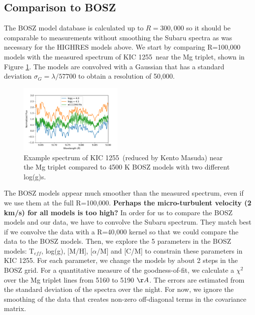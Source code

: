 \documentclass[twocolumn]{aastex61}
\newcommand{\shStar}{KIC 1255}
\begin{document}
\subsection{Comparison to BOSZ}
The BOSZ  \citep{bohlin2017bosz} model database is calculated up to $R = 300,000$ so it should be comparable to measurements without smoothing the Subaru spectra as was necessary for the HIGHRES models above.
We start by comparing R=100,000 models with the measured spectrum of \shStar\ near the Mg triplet, shown in Figure \ref{fig:mgTripletBOSZ}.
The models are convolved with a Gaussian that has a standard deviation $\sigma_G = \lambda/57700$  to obtain a resolution of 50,000.


\begin{figure}[!hbtp]
\begin{centering}
\includegraphics[width=0.45\textwidth]{images/subaru/bosz_mg_triplet.pdf}
\caption{Example spectrum of \shStar\ (reduced by Kento Masuda) near the Mg triplet compared to 4500 K BOSZ models with two different log(g)s.}\label{fig:mgTripletBOSZ}
\end{centering}
\end{figure}

The BOSZ models appear much smoother than the measured spectrum, even if we use them at the full R=100,000.
\textbf{Perhaps the micro-turbulent velocity (2 km/s) for all models is too high?}
In order for us to compare the BOSZ models and our data, we have to convolve the Subaru spectrum.
They match best if we convolve the data with a R=40,000 kernel so that we could compare the data to the BOSZ models.
Then, we explore the 5 parameters in the BOSZ models: T$_{eff}$, log(g), [M/H], [$\alpha$/M] and [C/M] to constrain these parameters in \shStar.
For each parameter, we change the models by about 2 steps in the BOSZ grid.
For a quantitative measure of the goodness-of-fit, we calculate a $\chi^2$ over the Mg triplet lines from 5160 to 5190 $\AA$.
The errors are estimated from the standard deviation of the spectra over the night.
For now, we ignore the smoothing of the data that creates non-zero off-diagonal terms in the covariance matrix.
\end{document}
